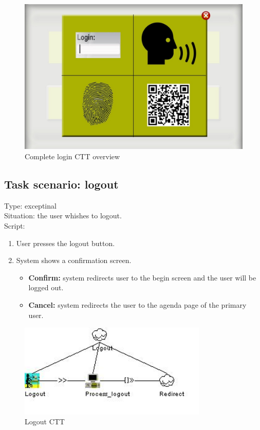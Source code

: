 \documentclass[11pt, a4paper,svglistings]{report}
\begin{document}
\begin{figure}[H]
\centering
    \includegraphics[width=1.4\textwidth, angle=90]{Login.jpg}
  \caption[Login CTT]{\label{fig:Login}Complete login CTT overview}
\end{figure}


\subsection{Task scenario: logout}

Type: exceptinal \\
Situation: the user whishes to logout. \\
Script:
\begin{enumerate}
\item User presses the logout button.
\item System shows a confirmation screen.
\begin{itemize}
\item \textbf{Confirm:} system redirects user to the begin screen and the user will be logged out.
\item \textbf{Cancel:} system redirects the user to the agenda page of the primary user.
\end{itemize}
\end{enumerate}

\begin{figure}[H]
\centering
    \includegraphics[width=0.8\textwidth]{Logout.jpg}
  \caption[Logout CTT]{\label{fig:Logout}Logout CTT}
\end{figure}
\end{document}
